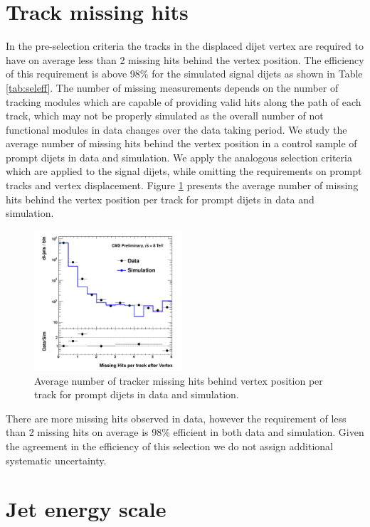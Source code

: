 \section{Track missing hits}

In the pre-selection criteria the tracks in the displaced dijet vertex are required to have on average
 less than 2 missing hits behind the vertex position. The efficiency of this requirement is above 98\% 
for the simulated signal dijets as shown in Table \ref{tab:seleff}. 
The number of missing measurements depends on the number of tracking modules which are capable of providing
valid hits along the path of each track, which may not be properly simulated as the overall number of 
not functional modules in data changes over the data taking period. We study the average number of missing
hits behind the vertex position in a control sample of prompt dijets in data and simulation. We apply the
analogous selection criteria which are applied to the signal dijets,
 while omitting the requirements on prompt tracks and vertex displacement. Figure \ref{fig:misshits} presents
the average number of missing hits behind the vertex position per track for prompt dijets in data and simulation.

\begin{figure}[htbp]
\centering
\includegraphics[width=0.49\textwidth]{plots/misshits/misshits.pdf}
\caption{Average number of tracker missing hits behind vertex position per track for prompt dijets
in data and simulation.\label{fig:misshits}}
\end{figure}

There are more missing hits observed in data, however the requirement of less than 2
missing hits on average is 98\% efficient in both data and simulation. Given the agreement in the efficiency
of this selection we do not assign additional systematic uncertainty. 

\section{Jet energy scale}
\label{sec:jessys}

